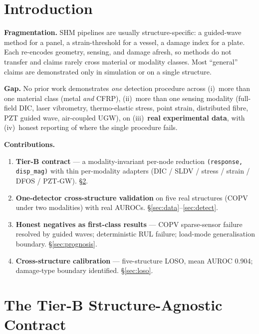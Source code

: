 \documentclass[10pt]{llncs}      %
\begin{document}

\section{Introduction}
\label{sec:intro}

\textbf{Fragmentation.}
SHM pipelines are usually structure-specific: a guided-wave method for a panel,
a strain-threshold for a vessel, a damage index for a plate.
Each re-encodes geometry, sensing, and damage afresh, so methods do not transfer
and claims rarely cross material or modality classes.
Most ``general'' claims are demonstrated only in simulation or on a single
structure.

\textbf{Gap.}
No prior work demonstrates \emph{one} detection procedure across
(i)~more than one material class (metal \emph{and} CFRP),
(ii)~more than one sensing modality (full-field DIC, laser vibrometry,
thermo-elastic stress, point strain, distributed fibre, PZT guided wave,
air-coupled UGW),
on (iii)~\textbf{real experimental data},
with (iv)~honest reporting of where the single procedure fails.

\textbf{Contributions.}
\begin{enumerate}
  \item \textbf{Tier-B contract} --- a modality-invariant per-node reduction
        \texttt{(response, disp\_mag)} with thin per-modality adapters
        (DIC / SLDV / stress / strain / DFOS / PZT-GW). \S\ref{sec:tierb}.
  \item \textbf{One-detector cross-structure validation} on five real structures
        (COPV under two modalities) with real AUROCs. \S\ref{sec:data}--\ref{sec:detect}.
  \item \textbf{Honest negatives as first-class results} --- COPV sparse-sensor
        failure resolved by guided waves; deterministic RUL failure;
        load-mode generalisation boundary. \S\ref{sec:prognosis}.
  \item \textbf{Cross-structure calibration} --- five-structure LOSO, mean AUROC
        0.904; damage-type boundary identified. \S\ref{sec:loso}.
\end{enumerate}

\section{The Tier-B Structure-Agnostic Contract}
\label{sec:tierb}
\end{document}
